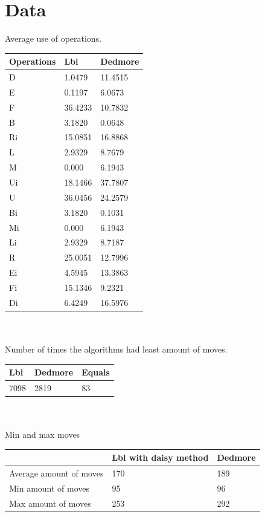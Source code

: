 \documentclass[a4paper,11pt]{kth-mag}
\begin{document}
\label{App:AppendixB}
\chapter{Data}
	
		Average use of operations.\\
		\begin{tabular}{|l|l|l|}
		\hline
		Operations & Lbl & Dedmore \\ \hline
		D & 1.0479 & 11.4515 \\ \hline
		E & 0.1197 & 6.0673 \\ \hline
		F & 36.4233 & 10.7832 \\ \hline
		B & 3.1820 & 0.0648 \\ \hline
		Ri & 15.0851 & 16.8868 \\ \hline
		L & 2.9329 & 8.7679 \\ \hline
		M & 0.000 &	6.1943 \\ \hline
		Ui & 18.1466 & 37.7807 \\ \hline
		U & 36.0456 & 24.2579 \\ \hline
		Bi & 3.1820 & 0.1031 \\ \hline
		Mi & 0.000 & 6.1943 \\ \hline
		Li & 2.9329 & 8.7187 \\ \hline
		R & 25.0051 & 12.7996 \\ \hline
		Ei & 4.5945 & 13.3863 \\ \hline
		Fi & 15.1346 & 9.2321 \\ \hline
		Di & 6.4249 & 16.5976 \\ \hline
		\end{tabular}
		\\\\
		Number of times the algorithms had least amount of moves.\\
		\begin{tabular}{|l|l|l|}
		\hline
		Lbl & Dedmore & Equals \\ \hline
		7098 & 2819 & 83 \\ \hline
		\end{tabular}
		\\\\
		Min and max moves \\
		\begin{tabular}{|l|l|l|}
		\hline
		 & Lbl with daisy method & Dedmore \\ \hline
		Average amount of moves & 170 & 189 \\ \hline 
		Min amount of moves & 95 & 96 \\ \hline
		Max amount of moves & 253 & 292 \\ \hline
		\end{tabular}		

	
\end{document}
